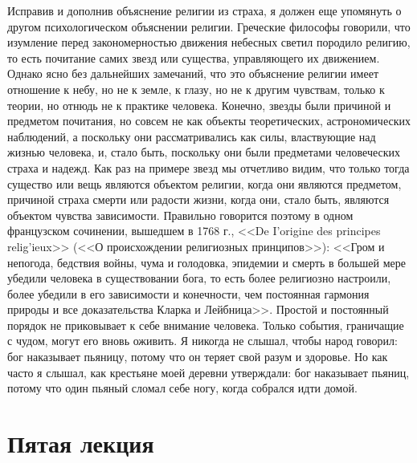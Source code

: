 \documentclass[12pt]{article}
\begin{document}
Исправив и дополнив объяснение религии из страха, я должен еще упомянуть о другом психологическом объяснении религии. Греческие философы говорили, что изумление перед закономерностью движения небесных светил породило религию, то есть почитание самих звезд или существа, управляющего их движением. Однако ясно без дальнейших замечаний, что это объяснение религии имеет отношение к небу, но не к земле, к глазу, но не к другим чувствам, только к теории, но отнюдь не к практике человека. Конечно, звезды были причиной и предметом почитания, но совсем не как объекты теоретических, астрономических наблюдений, а поскольку они рассматривались как силы, властвующие над жизнью человека, и, стало быть, поскольку они были предметами человеческих страха и надежд. Как раз на примере звезд мы отчетливо видим, что только тогда существо или вещь являются объектом религии, когда они являются предметом, причиной страха смерти или радости жизни, когда они, стало быть, являются объектом чувства зависимости. Правильно говорится поэтому в одном французском сочинении, вышедшем в 1768 г., <<De I'origine des principes relig'ieux>> (<<О происхождении религиозных принципов>>): <<Гром и непогода, бедствия войны, чума и голодовка, эпидемии и смерть в большей мере убедили человека в существовании бога, то есть более религиозно настроили, более убедили в его зависимости и конечности, чем постоянная гармония природы и все доказательства Кларка и Лейбница>>. Простой и постоянный порядок не приковывает к себе внимание человека. Только события, граничащие с чудом, могут его вновь оживить. Я никогда не слышал, чтобы народ говорил: бог наказывает пьяницу, потому что он теряет свой разум и здоровье. Но как часто я слышал, как крестьяне моей деревни утверждали: бог наказывает пьяниц, потому что один пьяный сломал себе ногу, когда собрался идти домой. 

{}
\section*{Пятая лекция}
\end{document}
